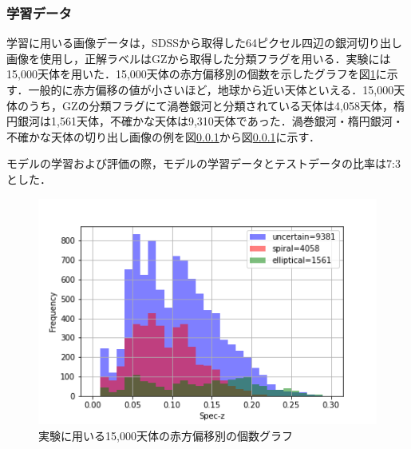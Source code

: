\documentclass[a4j, 11pt]{jreport}
\begin{document}
\subsubsection{学習データ}
学習に用いる画像データは，SDSSから取得した64ピクセル四辺の銀河切り出し画像を使用し，正解ラベルはGZから取得した分類フラグを用いる．実験には15,000天体を用いた．15,000天体の赤方偏移別の個数を示したグラフを図\ref{fig:z_15000}に示す．一般的に赤方偏移の値が小さいほど，地球から近い天体といえる．15,000天体のうち，GZの分類フラグにて渦巻銀河と分類されている天体は4,058天体，楕円銀河は1,561天体，不確かな天体は9,310天体であった．渦巻銀河・楕円銀河・不確かな天体の切り出し画像の例を図\ref{}から図\ref{}に示す．

モデルの学習および評価の際，モデルの学習データとテストデータの比率は7:3とした．

\begin{figure}[h]
 \centering
 \includegraphics[width=14cm]{images/z_15000_4.png}
 \caption{実験に用いる15,000天体の赤方偏移別の個数グラフ}
 \label{fig:z_15000}
\end{figure}
\end{document}
